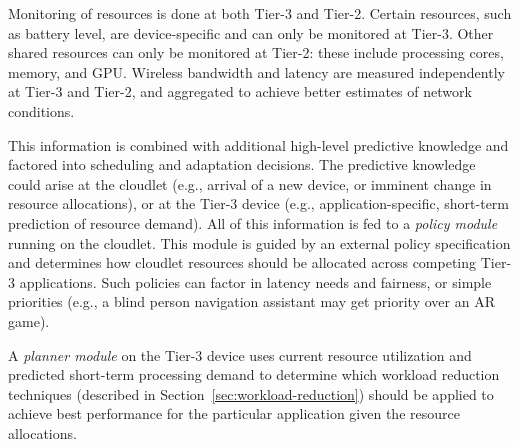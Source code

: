 Monitoring of resources is done at both Tier-3 and Tier-2.  Certain
resources, such as battery level, are device-specific and can only be
monitored at Tier-3.  Other shared resources can only be monitored at
Tier-2: these include processing cores, memory, and GPU.  Wireless
bandwidth and latency are measured independently at Tier-3 and Tier-2,
and aggregated to achieve better estimates of network conditions.

This information is combined with additional high-level predictive knowledge and
factored into scheduling and adaptation decisions.  The predictive knowledge
could arise at the cloudlet (e.g., arrival of a new device, or imminent change
in resource allocations), or at the Tier-3 device (e.g., application-specific,
short-term prediction of resource demand).  All of this information is fed to a
{\em policy module} running on the cloudlet.  This module is guided by an
external policy specification and determines how cloudlet resources should be
allocated across competing Tier-3 applications.  Such policies can factor in
latency needs and fairness, or simple priorities (e.g., a blind person
navigation assistant may get priority over an AR game).

A {\em planner module} on the Tier-3 device uses current resource
utilization and predicted short-term processing demand to determine
which workload reduction techniques (described in
Section~\ref{sec:workload-reduction}) should be applied to achieve
best performance for the particular application given the resource
allocations.

